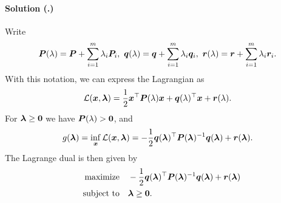 \documentclass{article}
\newcounter{problemSheetNumber}
\newcounter{problems}
\renewcommand{\solution}[1]{\paragraph{Solution (\theproblemSheetNumber.\theproblems)}\addtocounter{problems}{1}\label{#1}}
\begin{document}
\solution{pr:1} Write
\begin{equation*}
 \bm{P}(\lambda) = \bm{P}+\sum_{i=1}^m\lambda_i \bm{P}_i, \ \bm{q}(\lambda) = \bm{q}+\sum_{i=1}^m \lambda_i \bm{q}_i, \ \bm{r}(\lambda)=\bm{r}+\sum_{i=1}^m \lambda_i\bm{r}_i.
\end{equation*}
With this notation, we can express the Lagrangian as
\begin{equation*}
 \mathcal{L}(\bm{x},\bm{\lambda}) = \frac{1}{2}\bm{x}^{\top}\bm{P}(\lambda)\bm{x}+\bm{q}(\lambda)^{\top}\bm{x}+\bm{r}(\lambda).
\end{equation*}
For $\bm{\lambda}\geq \bm{0}$ we have $\bm{P}(\lambda)>\bm{0}$, and 
\begin{equation*}
 g(\bm{\lambda}) = \inf_{\bm{x}} \mathcal{L}(\bm{x},\bm{\lambda}) = -\frac{1}{2}\bm{q}(\bm{\lambda})^{\top}\bm{P}(\bm{\lambda})^{-1}\bm{q}(\bm{\lambda})+\bm{r}(\bm{\lambda}).
\end{equation*}
The Lagrange dual is then given by
\begin{align*}
\text{maximize}\quad &  -\frac{1}{2}\bm{q}(\bm{\lambda})^{\top}\bm{P}(\bm{\lambda})^{-1}\bm{q}(\bm{\lambda})+\bm{r}(\bm{\lambda})\\
\quad\text{subject to}\quad & \bm{\lambda}\geq \bm{0}.
\end{align*}
\end{document}
